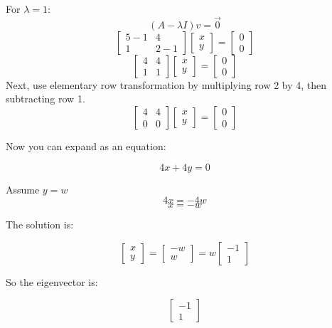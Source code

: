For $\lambda = 1$:
$$(A - \lambda I) v = \vec{0}$$
$$\begin{bmatrix}
5-1 & 4 \\
1 & 2-1 
\end{bmatrix}
\begin{bmatrix}
x \\
y 
\end{bmatrix} = 
\begin{bmatrix}
0 \\
0 
\end{bmatrix}$$
$$\begin{bmatrix}
4 & 4\\
1 & 1 
\end{bmatrix}
\begin{bmatrix}
x  \\
y 
\end{bmatrix} = 
\begin{bmatrix}
0  \\
0 
\end{bmatrix}$$
Next, use elementary row transformation by multiplying row 2 by 4, then subtracting row 1.
$$\begin{bmatrix}
4 & 4\\
0 & 0 
\end{bmatrix}
\begin{bmatrix}
x \\
y 
\end{bmatrix} = 
\begin{bmatrix}
0\\
0
\end{bmatrix}$$

Now you can expand as an equation:

$$4x + 4y = 0$$

Assume $y = w$
  $$4x = -4w$$
  $$x = -w$$

The solution is:

$$\begin{bmatrix}
x\\
y 
\end{bmatrix} = 
\begin{bmatrix}
-w \\
w 
\end{bmatrix} = 
w\begin{bmatrix}
-1\\
1
\end{bmatrix}$$

So the eigenvector is:

$$\begin{bmatrix}
-1\\
1
\end{bmatrix}$$

